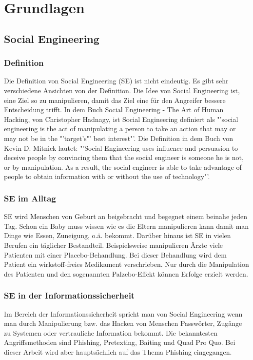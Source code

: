 
\chapter {Grundlagen}  %
\label{cha:grundlagen} %

\section{Social Engineering} %
\label {sec:Social Engineering} %
	\subsection{Definition}
	Die Definition von Social Engineering (SE) ist nicht eindeutig. Es gibt sehr verschiedene Ansichten von der Definition. Die Idee von Social Engineering ist, eine Ziel so zu manipulieren, damit das Ziel eine für den Angreifer bessere Entscheidung trifft. In dem Buch Social Engineering - The Art of Human Hacking, von Christopher Hadnagy, ist Social Engineering definiert als "'social engineering is the act of manipulating a person to take an action that may or may not be in the "'target’s"' best interest"'\cite{ArtOfHumanHacking}. Die Definition in dem Buch von Kevin D. Mitnick lautet: "'Social Engineering uses influence and persuasion to deceive people by convincing them that the social engineer is someone he is not, or by manipulation. As a result, the social engineer is able to take advantage of people to obtain information with or without the use of technology"'\cite{ArtOfDeception}.\\
	
	\subsection{SE im Alltag}
	SE wird Menschen von Geburt an beigebracht und begegnet einem beinahe jeden Tag. Schon ein Baby muss wissen wie es die Eltern manipulieren kann damit man Dinge wie Essen, Zuneigung, o.ä. bekommt. Darüber hinaus ist SE in vielen Berufen ein täglicher Bestandteil. Beispielsweise manipulieren Ärzte viele Patienten mit einer Placebo-Behandlung. Bei dieser Behandlung wird dem Patient ein wirkstoff-freies Medikament verschrieben. Nur durch die Manipulation des Patienten und den sogenannten Palzebo-Effekt können Erfolge erzielt werden.\\
	
	\subsection{SE in der Informationssicherheit}
	Im Bereich der Informationssicherheit spricht man von Social Engineering wenn man durch Manipulierung bzw. das Hacken von Menschen Passwörter, Zugänge zu Systemen oder vertrauliche Information bekommt. Die bekanntesten Angriffsmethoden sind Phishing, Pretexting, Baiting und Quad Pro Quo. Bei dieser Arbeit wird aber hauptsächlich auf das Thema Phishing eingegangen.

